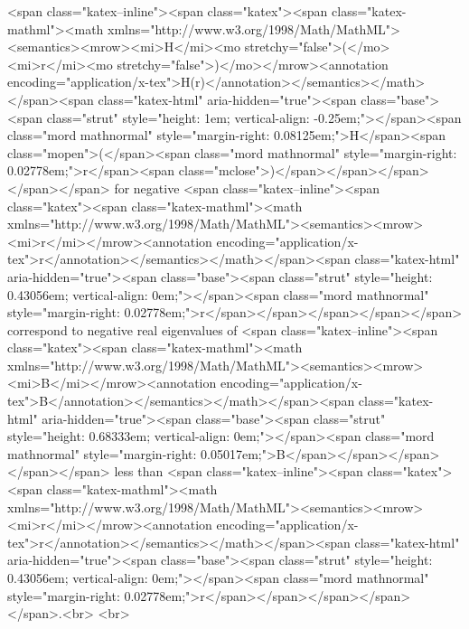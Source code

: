 <span class="katex--inline"><span class="katex"><span class="katex-mathml"><math xmlns="http://www.w3.org/1998/Math/MathML"><semantics><mrow><mi>H</mi><mo stretchy="false">(</mo><mi>r</mi><mo stretchy="false">)</mo></mrow><annotation encoding="application/x-tex">H(r)</annotation></semantics></math></span><span class="katex-html" aria-hidden="true"><span class="base"><span class="strut" style="height: 1em; vertical-align: -0.25em;"></span><span class="mord mathnormal" style="margin-right: 0.08125em;">H</span><span class="mopen">(</span><span class="mord mathnormal" style="margin-right: 0.02778em;">r</span><span class="mclose">)</span></span></span></span></span> for negative <span class="katex--inline"><span class="katex"><span class="katex-mathml"><math xmlns="http://www.w3.org/1998/Math/MathML"><semantics><mrow><mi>r</mi></mrow><annotation encoding="application/x-tex">r</annotation></semantics></math></span><span class="katex-html" aria-hidden="true"><span class="base"><span class="strut" style="height: 0.43056em; vertical-align: 0em;"></span><span class="mord mathnormal" style="margin-right: 0.02778em;">r</span></span></span></span></span> correspond to negative real eigenvalues of <span class="katex--inline"><span class="katex"><span class="katex-mathml"><math xmlns="http://www.w3.org/1998/Math/MathML"><semantics><mrow><mi>B</mi></mrow><annotation encoding="application/x-tex">B</annotation></semantics></math></span><span class="katex-html" aria-hidden="true"><span class="base"><span class="strut" style="height: 0.68333em; vertical-align: 0em;"></span><span class="mord mathnormal" style="margin-right: 0.05017em;">B</span></span></span></span></span> less than <span class="katex--inline"><span class="katex"><span class="katex-mathml"><math xmlns="http://www.w3.org/1998/Math/MathML"><semantics><mrow><mi>r</mi></mrow><annotation encoding="application/x-tex">r</annotation></semantics></math></span><span class="katex-html" aria-hidden="true"><span class="base"><span class="strut" style="height: 0.43056em; vertical-align: 0em;"></span><span class="mord mathnormal" style="margin-right: 0.02778em;">r</span></span></span></span></span>.<br>
\newline<br>
